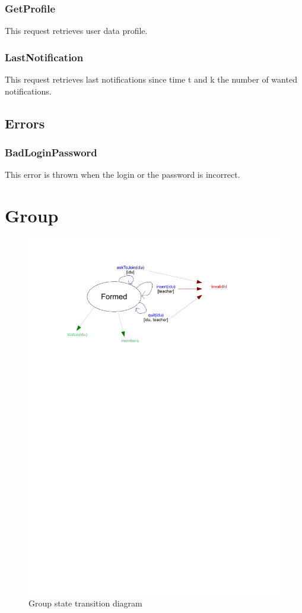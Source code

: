 		\subsubsection{GetProfile}
			This request retrieves user data profile.
		\subsubsection{LastNotification}
			This request retrieves last notifications since time t and k the number of wanted notifications.
	\subsection{Errors}
		\subsubsection{BadLoginPassword}
			This error is thrown when the login or the password is incorrect.
\newpage
\section{Group}
	\begin{figure}[ht]
			\begin{center}
				\includegraphics[width=\textwidth,  trim=2cm 18cm 2cm 1cm]{UML_figure/state_transition/dojo_logic/st_group.pdf}
				\caption{Group state transition diagram}
			\end{center}
	\end{figure}
